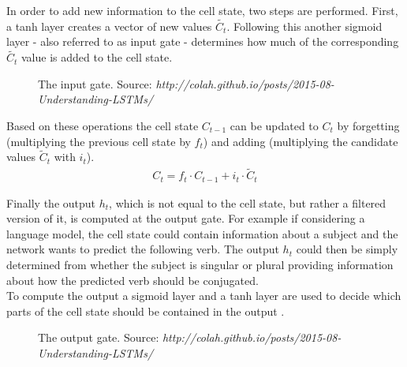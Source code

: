 \documentclass[11pt,a4paper,bibliography=totocnumbered,listof=totocnumbered]{scrartcl}
\begin{document}
In order to add new information to the cell state, two steps are performed. First, a tanh layer creates a vector of new values $\tilde{C_t}$. Following this another sigmoid layer - also referred to as input gate - determines how much of the corresponding $\tilde{C_t}$ value is added to the cell state.

	\begin{figure}[h!] 
		\label{fig:input}
		\caption{The input gate. Source: \textit{http://colah.github.io/posts/2015-08-Understanding-LSTMs/}}
	\end{figure}

Based on these operations the cell state $C_{t-1}$ can be updated to $C_t$ by forgetting (multiplying the previous cell state by $f_t$) and adding (multiplying the candidate values $\tilde{C}_t$ with $i_t$). 
\begin{align*}
	C_t = f_t \cdot C_{t-1} + i_t \cdot \tilde{C}_t
\end{align*}

Finally the output $h_t$, which is not equal to the cell state, but rather a filtered version of it, is computed at the output gate. For example if considering a language model, the cell state could contain information about a subject and the network wants to predict the following verb. The output $h_t$ could then be simply determined from whether the subject is singular or plural providing information about how the predicted verb should be conjugated. \\
To compute the output a sigmoid layer and a tanh layer are used to decide which parts of the cell state should be contained in the output \cite{Goodfellow-et-al-2016, lstm_colah}.

	\begin{figure}[h!] 
		\label{fig:output}
		\caption{The output gate. Source: \textit{http://colah.github.io/posts/2015-08-Understanding-LSTMs/}}
	\end{figure}
\end{document}
